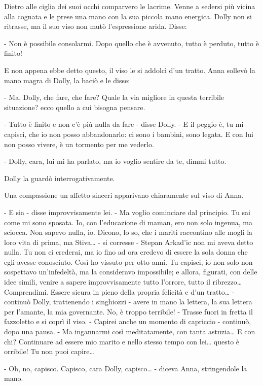 Dietro alle ciglia dei suoi occhi comparvero le lacrime. Venne a sedersi più vicina alla cognata e le prese una mano con la sua piccola mano energica. Dolly non si ritrasse, ma il suo viso non mutò l'espressione arida. Disse: 

- Non è possibile consolarmi. Dopo quello che è avvenuto, tutto è perduto, tutto è finito! 

E non appena ebbe detto questo, il viso le si addolcì d'un tratto. Anna sollevò la mano magra di Dolly, la baciò e le disse: 

- Ma, Dolly, che fare, che fare? Quale la via migliore in questa terribile situazione? ecco quello a cui bisogna pensare. 

- Tutto è finito e non c'è più nulla da fare - disse Dolly. - E il peggio è, tu mi capisci, che io non posso abbandonarlo: ci sono i bambini, sono legata. E con lui non posso vivere, è un tormento per me vederlo. 

- Dolly, cara, lui mi ha parlato, ma io voglio sentire da te, dimmi tutto. 

Dolly la guardò interrogativamente. 

Una compassione un affetto sinceri apparivano chiaramente sul viso di Anna. 

- E sia - disse improvvisamente lei. - Ma voglio cominciare dal principio. Tu sai come mi sono sposata. Io, con l'educazione di maman, ero non solo ingenua, ma sciocca. Non sapevo nulla, io. Dicono, lo so, che i mariti raccontino alle mogli la loro vita di prima, ma Stiva\ldots{} - si corresse - Stepan Arkad'ic non mi aveva detto nulla. Tu non ci crederai, ma io fino ad ora credevo di essere la sola donna che egli avesse conosciuto. Così ho vissuto per otto anni. Tu capisci, io non solo non sospettavo un'infedeltà, ma la consideravo impossibile; e allora, figurati, con delle idee simili, venire a sapere improvvisamente tutto l'orrore, tutto il ribrezzo\ldots{} Comprendimi. Essere sicura in pieno della propria felicità e d'un tratto\ldots{} - continuò Dolly, trattenendo i singhiozzi - avere in mano la lettera, la sua lettera per l'amante, la mia governante. No, è troppo terribile! - Trasse fuori in fretta il fazzoletto e si coprì il viso. - Capirei anche un momento di capriccio - continuò, dopo una pausa. - Ma ingannarmi così meditatamente, con tanta astuzia\ldots{} E con chi? Continuare ad essere mio marito e nello stesso tempo con lei\ldots{} questo è orribile! Tu non puoi capire\ldots{} 

- Oh, no, capisco. Capisco, cara Dolly, capisco\ldots{} - diceva Anna, stringendole la mano. 

